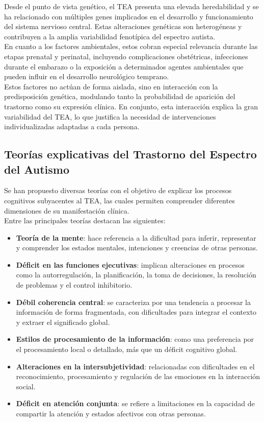\documentclass{article}
\begin{document}
Desde el punto de vista genético, el TEA presenta una elevada heredabilidad y se ha relacionado con múltiples genes implicados en el desarrollo y funcionamiento del sistema nervioso central. Estas alteraciones genéticas son heterogéneas y contribuyen a la amplia variabilidad fenotípica del espectro autista.\\

En cuanto a los factores ambientales, estos cobran especial relevancia durante las etapas prenatal y perinatal, incluyendo complicaciones obstétricas, infecciones durante el embarazo o la exposición a determinados agentes ambientales que pueden influir en el desarrollo neurológico temprano.\\

Estos factores no actúan de forma aislada, sino en interacción con la predisposición genética, modulando tanto la probabilidad de aparición del trastorno como su expresión clínica. En conjunto, esta interacción explica la gran variabilidad del TEA, lo que justifica la necesidad de intervenciones individualizadas adaptadas a cada persona.

\subsection{\textbf{Teorías explicativas del Trastorno del Espectro del Autismo}}
Se han propuesto diversas teorías con el objetivo de explicar los procesos cognitivos subyacentes al TEA, las cuales permiten comprender diferentes dimensiones de su manifestación clínica.\\

Entre las principales teorías destacan las siguientes:
\begin{itemize}
    \item \textbf{Teoría de la mente}: hace referencia a la dificultad para inferir, representar y comprender los estados mentales, intenciones y creencias de otras personas. 
    \item \textbf{Déficit en las funciones ejecutivas}: implican alteraciones en procesos como la autorregulación, la planificación, la toma de decisiones, la resolución de problemas y el control inhibitorio.
    \item \textbf{Débil coherencia central}: se caracteriza por una tendencia a procesar la información de forma fragmentada, con dificultades para integrar el contexto y extraer el significado global.
    \item \textbf{Estilos de procesamiento de la información}: como una preferencia por el procesamiento local o detallado, más que un déficit cognitivo global.
    \item \textbf{Alteraciones en la intersubjetividad}: relacionadas con dificultades en el reconocimiento, procesamiento y regulación de las emociones en la interacción social.
    \item \textbf{Déficit en atención conjunta}: se refiere a limitaciones en la capacidad de compartir la atención y estados afectivos con otras personas.
\end{itemize}
\end{document}
